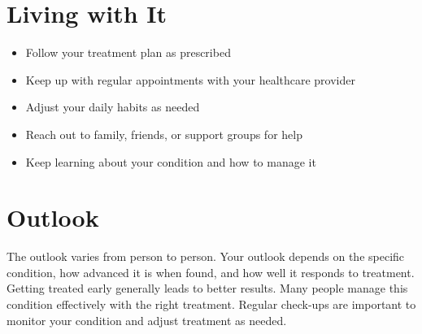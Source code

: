 \section{Living with It}

\begin{itemize}[noitemsep]
  \item Follow your treatment plan as prescribed
  \item Keep up with regular appointments with your healthcare provider
  \item Adjust your daily habits as needed
  \item Reach out to family, friends, or support groups for help
  \item Keep learning about your condition and how to manage it
\end{itemize}

\section{Outlook}
The outlook varies from person to person. Your outlook depends on the specific condition, how advanced it is when found, and how well it responds to treatment. Getting treated early generally leads to better results. Many people manage this condition effectively with the right treatment. Regular check-ups are important to monitor your condition and adjust treatment as needed.
